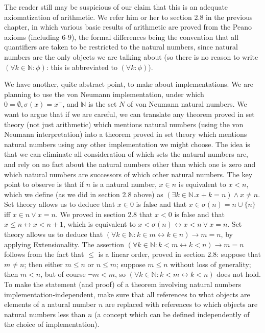\documentclass[12pt]{book}
\begin{document}
The reader still may be suspicious of our claim that this is an adequate axiomatization of arithmetic.  We refer him or her to section 2.8 in the previous chapter, in which various basic results of arithmetic are proved from the Peano axioms (including 6-9), the formal differences being the convention that all quantifiers are taken to be restricted to the natural numbers, since natural numbers are the only objects we are talking about (so there is no reason to write $(\forall k \in {\mathbb N}:\phi)$:  this is abbreviated to $(\forall k :\phi)$).

We have another, quite abstract point, to make about implementations.  We are planning to use the von Neumann implementation, under which $0=\emptyset, \sigma(x)=x^+$,
and $\mathbb N$ is the set $N$ of von Neumann natural numbers.  We want to argue that if we are careful, we can translate any theorem proved in set theory (not just arithmetic) which mentions natural numbers (using the von Neumann interpretation) into a theorem proved in set theory which mentions natural numbers using any other implementation we might choose.  The idea is that we can eliminate all consideration of which sets the natural numbers are, and rely on no fact about the natural numbers other than which one is zero and which natural numbers are successors of which other natural numbers.  The key point to observe is that if $n$ is a natural number, $x \in n$ is equivalent to $x < n$, which we define
(as we did in section 2.8 above) as $(\exists k\in {\mathbb N}.x+k = n) \wedge x \neq n$.   Set theory allows us to deduce that $x \in 0$ is false and that $x \in \sigma(n) = n \cup \{n\}$ iff $x \in n \vee x = n$.  We proved in section 2.8 that $x<0$ is false and that $x \leq n \leftrightarrow x < n+1$, which is equivalent to $x<\sigma(n) \leftrightarrow x<n \vee x=n$.  Set theory allows us to deduce that $(\forall k \in {\mathbb N}:k \in m \leftrightarrow k \in n) \rightarrow m=n$, by applying Extensionality.  The assertion $(\forall k \in {\mathbb N}:k<m \leftrightarrow k<n) \rightarrow m=n$ follows from the fact that $\leq$ is a linear order, proved in section 2.8:  suppose that $m \neq n$;  then either $m \leq n$ or $n \leq m$;  suppose $m \leq n$ without loss of generality;  then $m<n$, but of course $\neg m<m$, so $(\forall k \in {\mathbb N}:k<m \leftrightarrow k<n)$ does not hold.  To make the statement (and proof) of a theorem involving natural numbers implementation-independent, make sure that all references to what objects are elements of a natural number $n$ are replaced with references to which objects are natural numbers less than $n$ (a concept which can be defined independently of the choice of implementation).
\end{document}
